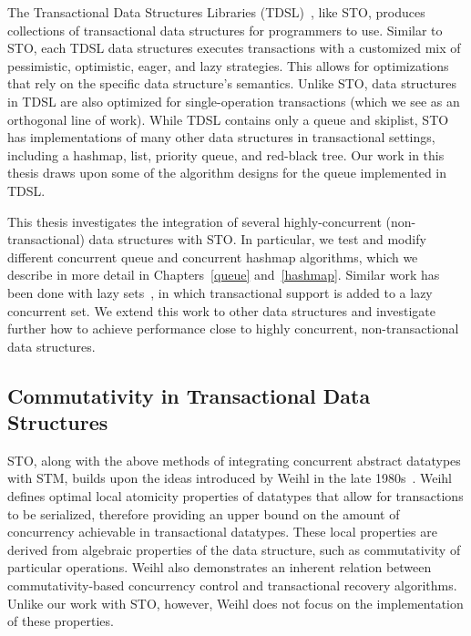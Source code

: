 The Transactional Data Structures Libraries (TDSL)~\cite{tdsl}, like STO, produces collections of transactional data structures for programmers to use. Similar to STO, each TDSL data structures executes transactions with a customized mix of pessimistic, optimistic, eager, and lazy strategies.
This allows for optimizations that rely on the specific data structure's semantics. Unlike STO, data structures in TDSL are also optimized for single-operation transactions (which we see as an orthogonal line of work). While TDSL contains only a queue and skiplist, STO has implementations of many other data structures in transactional settings, including a hashmap, list, priority queue, and red-black tree. Our work in this thesis draws upon some of the algorithm designs for the queue implemented in TDSL.

This thesis investigates the integration of several highly-concurrent (non-transactional) data structures with STO. In particular, we test and modify different concurrent queue and concurrent hashmap algorithms, which we describe in more detail in Chapters~\ref{queue} and~\ref{hashmap}. Similar work has been done with lazy sets~\cite{lazyset}, in which transactional support is added to a lazy concurrent set. We extend this work to other data structures and investigate further how to achieve performance close to highly concurrent, non-transactional data structures.

\subsection{Commutativity in Transactional Data Structures}

STO, along with the above methods of integrating concurrent abstract datatypes with STM, builds upon the ideas introduced by Weihl in the late 1980s~\cite{weihl}. Weihl defines optimal local atomicity properties of datatypes that allow for transactions to be serialized, therefore providing an upper bound on the amount of concurrency achievable in transactional datatypes. These local properties are derived from algebraic properties of the data structure, such as commutativity of particular operations. Weihl also demonstrates an inherent relation between commutativity-based concurrency control and transactional recovery algorithms. Unlike our work with STO, however, Weihl does not focus on the implementation of these properties.

